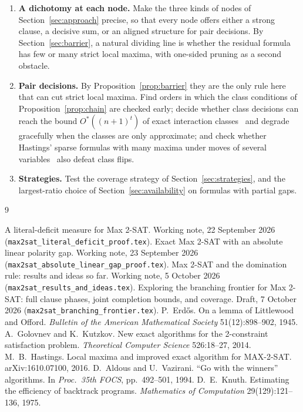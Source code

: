 \documentclass[11pt,a4paper]{article}
\theoremstyle{remark}
\newcommand{\Ostar}{O^{*}}
\begin{document}
\begin{enumerate}
 reasoning beyond them for contradictions of parity type; choose orders that
 maximize cancellation; test formulas with planted aligned groups, where
 cancellation is partial.
 \item \textbf{A dichotomy at each node.} Make the three kinds of nodes of
 Section~\ref{sec:approach} precise, so that every node offers either a strong
 clause, a decisive sum, or an aligned structure for pair decisions. By
 Section~\ref{sec:barrier}, a natural dividing line is whether the residual
 formula has few or many strict local maxima, with one-sided pruning as a
 second obstacle.
 \item \textbf{Pair decisions.} By Proposition~\ref{prop:barrier} they are the
 only rule here that can cut strict local maxima. Find orders in which the
 class conditions of Proposition~\ref{prop:chain} are checked early; decide
 whether class decisions can reach the bound $\Ostar((n+1)^t)$ of exact
 interaction classes~\cite{N5} and degrade gracefully when the classes are only
 approximate; and check whether Hastings' sparse formulas with many maxima under
 moves of several variables~\cite{Has16} also defeat class flips.
 \item \textbf{Strategies.} Test the coverage strategy of
 Section~\ref{sec:strategies}, and the largest-ratio choice of
 Section~\ref{sec:availability} on formulas with partial gaps.
\end{enumerate}

\begin{thebibliography}{9}
\raggedright
{} A literal-deficit measure for Max 2-SAT. Working note,
 22 September 2026 (\texttt{max2sat\_literal\_deficit\_proof.tex}).
 Exact Max 2-SAT with an absolute linear polarity gap. Working
 note, 23 September 2026 (\texttt{max2sat\_absolute\_linear\_gap\_proof.tex}).
 Max 2-SAT and the domination rule: results and ideas so far.
 Working note, 5 October 2026 (\texttt{max2sat\_results\_and\_ideas.tex}).
 Exploring the branching frontier for Max 2-SAT: full clause
 phases, joint completion bounds, and coverage. Draft, 7 October 2026
 (\texttt{max2sat\_branching\_frontier.tex}).
 P.~Erd\H{o}s. On a lemma of Littlewood and Offord.
 \emph{Bulletin of the American Mathematical Society} 51(12):898--902, 1945.
 A.~Golovnev and K.~Kutzkov. New exact algorithms for the
 2-constraint satisfaction problem. \emph{Theoretical Computer Science}
 526:18--27, 2014.
 M.~B.~Hastings. Local maxima and improved exact algorithm for
 MAX-2-SAT. arXiv:1610.07100, 2016.
 D.~Aldous and U.~Vazirani. ``Go with the winners''
 algorithms. In \emph{Proc.\ 35th FOCS}, pp.~492--501, 1994.
 D.~E.~Knuth. Estimating the efficiency of backtrack
 programs. \emph{Mathematics of Computation} 29(129):121--136, 1975.
\end{thebibliography}
\end{document}
